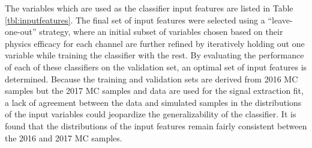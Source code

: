The variables which are used as the classifier input features are listed in Table \ref{tbl:inputfeatures}. The final set of input features were selected using a ``leave-one-out'' strategy, where an initial subset of variables chosen based on their physics efficacy for each channel are further refined by iteratively holding out one variable while training the classifier with the rest. By evaluating the performance of each of these classifiers on the validation set, an optimal set of input features is determined. Because the training and validation sets are derived from 2016 MC samples but the 2017 MC samples and data are used for the signal extraction fit, a lack of agreement between the data and simulated samples in the distributions of the input variables could jeopardize the generalizability of the classifier. It is found that the distributions of the input features remain fairly consistent between the 2016 and 2017 MC samples. 

